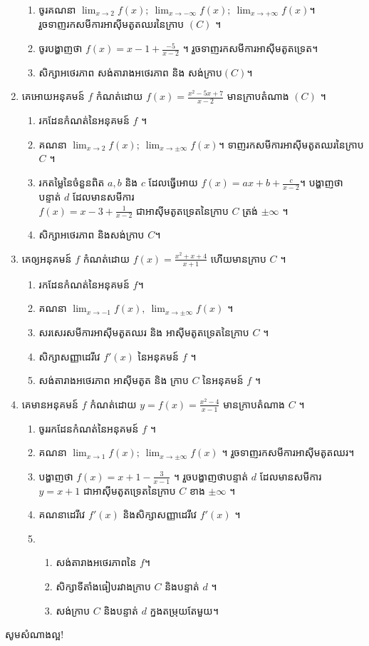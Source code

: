 \documentclass[12pt, a4paper]{article}
\begin{document}
\begin{enumerate}[m]
\begin{enumerate}[k]
		\item ចូរគណនា $\lim_{x\to 2}f(x);\ \lim_{x\to -\infty}f(x);\ \lim_{x\to +\infty}f(x)$។ រួចទាញរកសមីការអាស៊ីមតូតឈរនៃក្រាប $(C)$ ។
		\item ចូរបង្ហាញថា $f(x)=x-1+\frac{-5}{x-2}$ ។ រួចទាញរកសមីការអាស៊ីមតូតទ្រេត។
		\item សិក្សាអថេរភាព សង់តារាងអថេរភាព និង សង់ក្រាប$(C)$។ 
	\end{enumerate}
	\item គេអោយអនុគមន៍ $f$ កំណត់ដោយ $f(x)=\frac{x^2-5x+7}{x-2}$ មានក្រាបតំណាង $(C)$ ។
	\begin{enumerate}[k]
		\item រកដែនកំណត់នៃអនុគមន៍ $f$ ។ 
		\item គណនា $\lim_{x\to 2}f(x);\ \lim_{x\to\pm\infty}f(x)$។ ទាញរកសមីការអាស៊ីមតូតឈរនៃក្រាប $C$ ។
		\item រកតម្លៃនៃចំនួនពិត $a,b$ និង $c$ ដែលធ្វើអោយ $f(x)=ax+b+\frac{c}{x-2}$។ បង្ហាញថា បន្ទាត់ $d$ ដែលមានសមីការ \\$f(x)=x-3+\frac{1}{x-2}$ ជាអាស៊ីមតូតទ្រេតនៃក្រាប $C$ ត្រង់ $\pm\infty$ ។
		\item សិក្សាអថេរភាព និងសង់ក្រាប $C$។
	\end{enumerate}
	\item គេឲ្យអនុគមន៍ $f$ កំណត់ដោយ $f(x)=\frac{x^2+x+4}{x+1}$ ហើយមានក្រាប $C$ ។
	\begin{enumerate}[k]
		\item រកដែនកំណត់នៃអនុគមន៍ $f$។ 
		\item គណនា $\lim_{x\to -1}f(x),\ \lim_{x\to \pm\infty}f(x)$ ។
		\item សរសេរសមីការអាស៊ីមតូតឈរ និង អាស៊ីមតូតទ្រេតនៃក្រាប $C$ ។
		\item  សិក្សាសញ្ញាដេរីវេ $f'(x)$ នៃអនុគមន៍ $f$ ។
		\item សង់តារាងអថេរភាព អាស៊ីមតូត និង ក្រាប $C$ នៃអនុគមន៍ $f$ ។
	\end{enumerate}
	\item  គេមានអនុគមន៍ $f$ កំណត់ដោយ $y=f(x)=\frac{x^2-4}{x-1}$   មានក្រាបតំណាង $C$ ។
	\begin{enumerate}[m]
		\item ចូររកដែនកំណត់នៃអនុគមន៍ $f$ ។
		\item គណនា $\lim_{x\to 1}f(x);\ \lim_{x\to \pm\infty}f(x)$ ។ រួចទាញរកសមីការអាស៊ីមតូតឈរ។
		\item បង្ហាញថា $f(x)=x+1-\frac{3}{x-1}$ ។ រួចបង្ហាញថាបន្ទាត់ $d$ ដែលមានសមីការ $y=x+1$ ជាអាស៊ីមតូតទ្រេតនៃក្រាប $C$ ខាង $\pm\infty$ ។
		\item គណនាដេរីវេ $f'(x)$ និងសិក្សាសញ្ញាដេរីវេ $f'(x)$ ។
		\item 
		\begin{enumerate}[k]
			\item សង់តារាងអថេរភាពនៃ $f$។ 
			\item សិក្សាទីតាំងធៀបរវាងក្រាប $C$ និងបន្ទាត់ $d$ ។
			\item សង់ក្រាប $C$ និងបន្ទាត់ $d$ ក្នងតម្រុយតែមួយ។
		\end{enumerate}
	\end{enumerate}
	\end{enumerate}
		\begin{center}
		\sffamily\color{blue}
		សូមសំណាងល្អ!
		\end{center}
\end{document}
